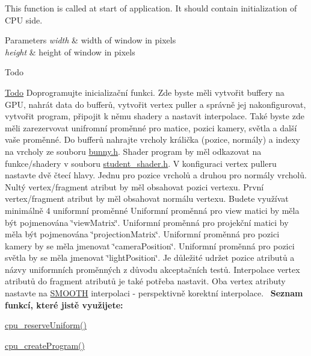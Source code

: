 This function is called at start of application. It should contain initialization of C\+PU side. 


\begin{DoxyParams}{Parameters}
{\em width} & width of window in pixels \\
\hline
{\em height} & height of window in pixels \\
\hline
\end{DoxyParams}
\begin{DoxyRefDesc}{Todo}
\item[\hyperlink{todo__todo000001}{Todo}]Doprogramujte inicializační funkci. Zde byste měli vytvořit buffery na G\+PU, nahrát data do bufferů, vytvořit vertex puller a správně jej nakonfigurovat, vytvořit program, připojit k němu shadery a nastavit interpolace. Také byste zde měli zarezervovat unifromní proměnné pro matice, pozici kamery, světla a další vaše proměnné. Do bufferů nahrajte vrcholy králička (pozice, normály) a indexy na vrcholy ze souboru \hyperlink{bunny_8h}{bunny.\+h}. Shader program by měl odkazovat na funkce/shadery v souboru \hyperlink{student__shader_8h}{student\+\_\+shader.\+h}. V konfiguraci vertex pulleru nastavte dvě čtecí hlavy. Jednu pro pozice vrcholů a druhou pro normály vrcholů. Nultý vertex/fragment atribut by měl obsahovat pozici vertexu. První vertex/fragment atribut by měl obsahovat normálu vertexu. Budete využívat minimálně 4 uniformní proměnné Uniformní proměnná pro view matici by měla být pojmenována \char`\"{}view\+Matrix\char`\"{}. Uniformní proměnná pro projekční matici by měla být pojmenována \char`\"{}projection\+Matrix\char`\"{}. Uniformní proměnná pro pozici kamery by se měla jmenovat \char`\"{}camera\+Position\char`\"{}. Uniformní proměnná pro pozici světla by se měla jmenovat \char`\"{}light\+Position\char`\"{}. Je důležité udržet pozice atributů a názvy uniformních proměnných z důvodu akceptačních testů. Interpolace vertex atributů do fragment atributů je také potřeba nastavit. Oba vertex atributy nastavte na \hyperlink{program_8h_a8472f01c511d77bbfb981a46618ea1eaa33c7ccbb848d8fd75455dd9786a1153a}{S\+M\+O\+O\+TH} interpolaci -\/ perspektivně korektní interpolace.~\newline
 {\bfseries Seznam funkcí, které jistě využijete\+:}
\begin{DoxyItemize}
\item \hyperlink{uniforms_8h_acd308bcb7720918cb48f75292a247dfb}{cpu\+\_\+reserve\+Uniform()}
\item \hyperlink{program_8h_a4fca7a0e3dac7f93620a1bde6efcde16}{cpu\+\_\+create\+Program()}

\end{DoxyItemize}
\end{DoxyRefDesc}
